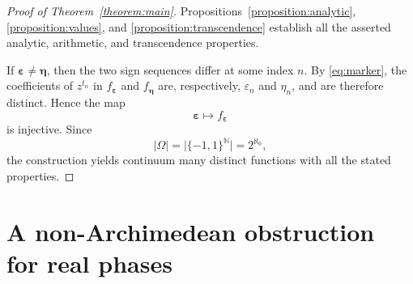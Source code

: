 \documentclass[10pt,a4paper]{amsart}
\numberwithin{equation}{section}
\newcommand{\N}{\mathbb N}
\newcommand{\abs}[1]{\lvert #1\rvert}
\begin{document}
\begin{proof}[Proof of Theorem~\ref{theorem:main}]
Propositions~\ref{proposition:analytic},
\ref{proposition:values}, and
\ref{proposition:transcendence} establish all the asserted analytic,
arithmetic, and transcendence properties.

If $\boldsymbol\varepsilon\neq\boldsymbol\eta$, then the two sign sequences
differ at some index $n$. By \eqref{eq:marker}, the coefficients of
$z^{t_n}$ in $f_{\boldsymbol\varepsilon}$ and
$f_{\boldsymbol\eta}$ are, respectively, $\varepsilon_n$ and $\eta_n$,
and are therefore distinct. Hence the map
\[
        \boldsymbol\varepsilon
        \longmapsto
        f_{\boldsymbol\varepsilon}
\]
is injective. Since
\[
        \abs{\Omega}
        =
        \abs{\{-1,1\}^{\N}}
        =
        2^{\aleph_0},
\]
the construction yields continuum many distinct functions with all the
stated properties.
\end{proof}


\section{A non-Archimedean obstruction for real phases}
\label{section:real-phases}
\end{document}
